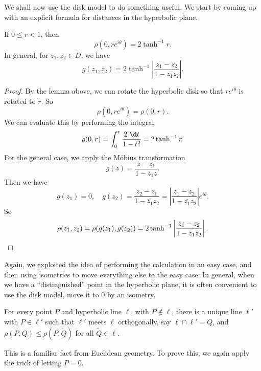 \documentclass[a4paper]{article}
\begin{document}
We shall now use the disk model to do something useful. We start by coming up with an explicit formula for distances in the hyperbolic plane.
\begin{prop}
  If $0 \leq r < 1$, then
  \[
    \rho(0, r e^{i\theta}) = 2 \tanh^{-1} r.
  \]
  In general, for $z_1, z_2 \in D$, we have
  \[
    g(z_1, z_2) = 2 \tanh^{-1} \left|\frac{z_1 - z_2}{1 - \bar{z_1} z_2}\right|.
  \]
\end{prop}

\begin{proof}
  By the lemma above, we can rotate the hyperbolic disk so that $re^{i\theta}$ is rotated to $r$. So
  \[
    \rho(0, r e^{i\theta}) = \rho(0, r).
  \]
  We can evaluate this by performing the integral
  \[
    \rho(0, r) = \int_0^r \frac{2 \;\d t}{1 - t^2} = 2 \tanh^{-1} r.
  \]
  For the general case, we apply the M\"obius transformation
  \[
    g(z) = \frac{z - z_1}{1 - \bar{z}_1 z}.
  \]
  Then we have
  \[
    g(z_1) = 0,\quad g(z_2) = \frac{z_2 - z_1}{1 - \bar{z}_1 z_2} = \left|\frac{z_1 - z_2}{1 - \bar{z_1} z_2}\right| e^{i\theta}.
  \]
  So
  \[
    \rho(z_1, z_2) = \rho(g(z_1), g(z_2)) = 2 \tanh^{-1} \left|\frac{z_1 - z_2}{1 - \bar{z_1} z_2}\right|.\qedhere
  \]
\end{proof}
Again, we exploited the idea of performing the calculation in an easy case, and then using isometries to move everything else to the easy case. In general, when we have a ``distinguished'' point in the hyperbolic plane, it is often convenient to use the disk model, move it to $0$ by an isometry.

\begin{prop}
  For every point $P$ and hyperbolic line $\ell$, with $P \not\in \ell$, there is a unique line $\ell'$ with $P \in \ell'$ such that $\ell'$ meets $\ell$ orthogonally, say $\ell \cap \ell' = Q$, and $\rho(P, Q) \leq \rho(P, \tilde{Q})$ for all $\tilde{Q} \in \ell$.
\end{prop}
This is a familiar fact from Euclidean geometry. To prove this, we again apply the trick of letting $P = 0$.
\end{document}
